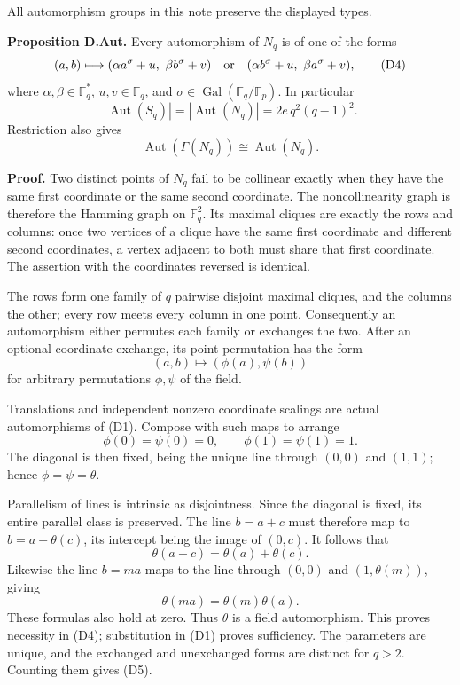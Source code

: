 All automorphism groups in this note preserve the displayed types.

\textbf{Proposition D.Aut.} Every automorphism of \(N_q\) is of one of
the forms \[
(a,b)\longmapsto
(\alpha a^\sigma+u,\ \beta b^\sigma+v)
\quad\hbox{or}\quad
(\alpha b^\sigma+u,\ \beta a^\sigma+v),
\tag{D4}
\] where \(\alpha,\beta\in\mathbb F_q^*\), \(u,v\in\mathbb F_q\), and
\(\sigma\in\operatorname{Gal}(\mathbb F_q/\mathbb F_p)\). In particular
\[
|\operatorname{Aut}(S_q)|=|\operatorname{Aut}(N_q)|
=2e\,q^2(q-1)^2.
\tag{D5}
\] Restriction also gives \[
\operatorname{Aut}(\Gamma(N_q))\cong\operatorname{Aut}(N_q).
\tag{D6}
\]

\textbf{Proof.} Two distinct points of \(N_q\) fail to be collinear
exactly when they have the same first coordinate or the same second
coordinate. The noncollinearity graph is therefore the Hamming graph on
\(\mathbb F_q^2\). Its maximal cliques are exactly the rows and columns:
once two vertices of a clique have the same first coordinate and
different second coordinates, a vertex adjacent to both must share that
first coordinate. The assertion with the coordinates reversed is
identical.

The rows form one family of \(q\) pairwise disjoint maximal cliques, and
the columns the other; every row meets every column in one point.
Consequently an automorphism either permutes each family or exchanges
the two. After an optional coordinate exchange, its point permutation
has the form \[
(a,b)\longmapsto(\phi(a),\psi(b))
\] for arbitrary permutations \(\phi,\psi\) of the field.

Translations and independent nonzero coordinate scalings are actual
automorphisms of (D1). Compose with such maps to arrange \[
\phi(0)=\psi(0)=0,\qquad \phi(1)=\psi(1)=1.
\] The diagonal is then fixed, being the unique line through \((0,0)\)
and \((1,1)\); hence \(\phi=\psi=\theta\).

Parallelism of lines is intrinsic as disjointness. Since the diagonal is
fixed, its entire parallel class is preserved. The line \(b=a+c\) must
therefore map to \(b=a+\theta(c)\), its intercept being the image of
\((0,c)\). It follows that \[
\theta(a+c)=\theta(a)+\theta(c).
\] Likewise the line \(b=ma\) maps to the line through \((0,0)\) and
\((1,\theta(m))\), giving \[
\theta(ma)=\theta(m)\theta(a).
\] These formulas also hold at zero. Thus \(\theta\) is a field
automorphism. This proves necessity in (D4); substitution in (D1) proves
sufficiency. The parameters are unique, and the exchanged and
unexchanged forms are distinct for \(q>2\). Counting them gives (D5).

